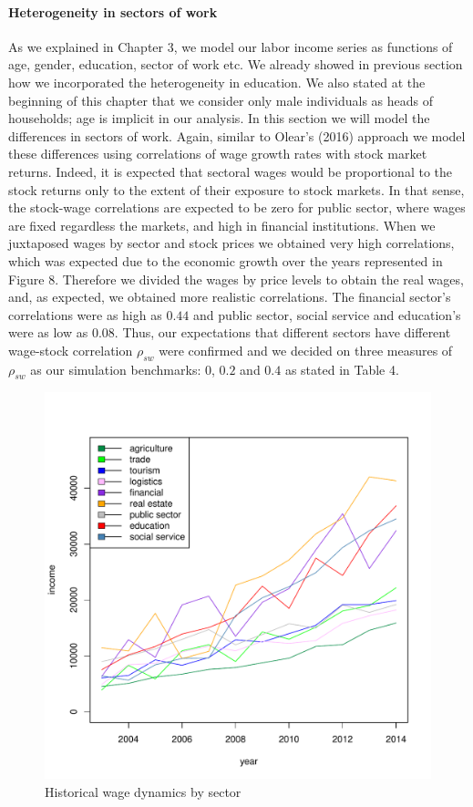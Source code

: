 \documentclass[]{article}
\begin{document}
\paragraph{Heterogeneity in sectors of work}

As we explained in Chapter 3, we model our labor income series as functions of age, gender, education, sector of work etc. We already showed in previous section how we incorporated the heterogeneity in education. We also stated at the beginning of this chapter that we consider only male individuals as heads of households; age is implicit in our analysis. In this section we will model the differences in sectors of work. Again, similar to Olear's (2016) approach we model these differences using correlations of wage growth rates with stock market returns. Indeed, it is expected that sectoral wages would be proportional to the stock returns only to the extent of their exposure to stock markets. In that sense, the stock-wage correlations are expected to be zero for public sector, where wages are fixed regardless the markets, and high in financial institutions. When we juxtaposed wages by sector and stock prices we obtained very high correlations, which was expected due to the economic growth over the years represented in Figure 8. Therefore we divided the wages by price levels to obtain the real wages, and, as expected, we obtained more realistic correlations. The financial sector's correlations were as high as $0.44$  and public sector, social service and education's were as low as $0.08$. Thus, our expectations that different sectors have different wage-stock correlation $\rho_{sw}$ were confirmed and we decided on three measures of $\rho_{sw}$ as our simulation benchmarks: $0$, $0.2$ and $0.4$ as stated in Table 4.

\begin{figure}[h]
	\centering
	\includegraphics[scale=0.6]{figs/wage2sec.pdf}
	\caption{Historical wage dynamics by sector}
\end{figure}
\end{document}
